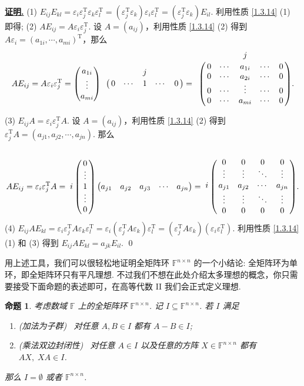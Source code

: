 \documentclass[10pt,openany]{article}
\theoremstyle{thmstyle} %
\theoremstyle{defstyle} %
\theoremstyle{prostyle} %
\newtheorem{proposition}[theorem]{命题}
\theoremstyle{exastyle}
\theoremstyle{remstyle}
\renewenvironment{proof}[1][证明]{\par\underline{\textbf{#1.}} \;\fangsong}{\qed\par}
\newcommand{\T}{^{\text{T}}}
\newcommand{\F}{\mathbb{F}}
\begin{document}
\begin{proof}
	(1) \( E_{ij}E_{kl}= \varepsilon_i\varepsilon_j\T\varepsilon_k\varepsilon_l\T= (\varepsilon_j\T\varepsilon_k)\varepsilon_i\varepsilon_l\T =(\varepsilon_j\T\varepsilon_k)E_{il} \). 利用性质 \ref{1.3.14} (1) 即得; (2) \( AE_{ij}=A\varepsilon_i\varepsilon_j\T \).  设 \( A=(a_{ij}) \)，利用性质 \ref{1.3.14} (2) 得到 \( A\varepsilon_i=(a_{1i},\cdots,a_{mi})\T \)，那么
	\[ AE_{ij}=A\varepsilon_i\varepsilon_j\T= \begin{pmatrix}
		a_{1i} \\ \vdots \\ a_{mi}
	\end{pmatrix}\bordermatrix{
	& & & j & & \cr
	& 0 & \cdots & 1 & \cdots & 0 
	}= \bordermatrix{
	& & & j & & \cr
	& 0 & \cdots & a_{1i} & \cdots & 0 \cr
	& 0 & \cdots & a_{2i} & \cdots & 0 \cr
	& 0 & \cdots & \vdots & \cdots & 0 \cr
	& 0 & \cdots & a_{mi} & \cdots & 0 \cr
	}. \]
	
	(3) \( E_{ij}A=\varepsilon_i\varepsilon_j\T A \). 设 \( A=(a_{ij}) \)，利用性质 \ref{1.3.14} (2) 得到 \( \varepsilon_j\T A=(a_{j1},a_{j2},\cdots,a_{jn}) \). 那么
	\[ AE_{ij}=\varepsilon_i\varepsilon_j\T A= \bordermatrix{
		&  \cr
		& 0  \cr
		& \vdots \cr
		i & 1 \cr
		& \vdots \cr
		& 0 
	} \begin{pmatrix}
	a_{j1} & a_{j2} & a_{j3} & \cdots & a_{jn}
	\end{pmatrix}
	= \bordermatrix{
		& & &  &  \cr
		& 0 & 0 & 0 & 0   \cr
		& \vdots & \vdots & \ddots & \vdots \cr
	  i	& a_{j1} & a_{j2} & \cdots  & a_{jn}  \cr
		& \vdots & \vdots & \ddots & \vdots  \cr
		& 0& 0& 0 &0  \cr
	}. \]
	(4) \( E_{ij}AE_{kl} =\varepsilon_i\varepsilon_j\T A\varepsilon_k\varepsilon_l\T=\varepsilon_i(\varepsilon_j\T A\varepsilon_k)\varepsilon_l\T=(\varepsilon_j\T A\varepsilon_k)(\varepsilon_i\varepsilon_l\T) \). 利用性质 \ref{1.3.14} (1) 和 (3) 得到 \( E_{ij}AE_{kl} =a_{jk}E_{il} \).
\end{proof}

\vspace{1ex}

用上述工具，我们可以很轻松地证明全矩阵环 \( \F^{n \times n} \) 的一个小结论: 全矩阵环为单环，即全矩阵环只有平凡理想. 不过我们不想在此处介绍太多理想的概念，你只需要接受下面命题的表述即可，在高等代数 II 我们会正式定义理想. 

\begin{proposition}
	考虑数域 \( \F \) 上的全矩阵环 \( \F^{n \times n} \). 记 \( I \subseteq \F^{n \times n} \). 若 \( I \) 满足
	\begin{enumerate}[(1)]
		\item (加法为子群) \ 对任意 \( A,B \in I \) 都有 \( A-B \in I \);
		\item (乘法双边封闭性) \ 对任意 \( A  \in I \) 以及任意的方阵 \( X \in \F^{n \times n} \) 都有 \( AX, \; XA \in I \).
	\end{enumerate}
	
	那么 \( I= \emptyset \) 或者 \( \F^{n \times n} \).
\end{proposition}
\end{document}
